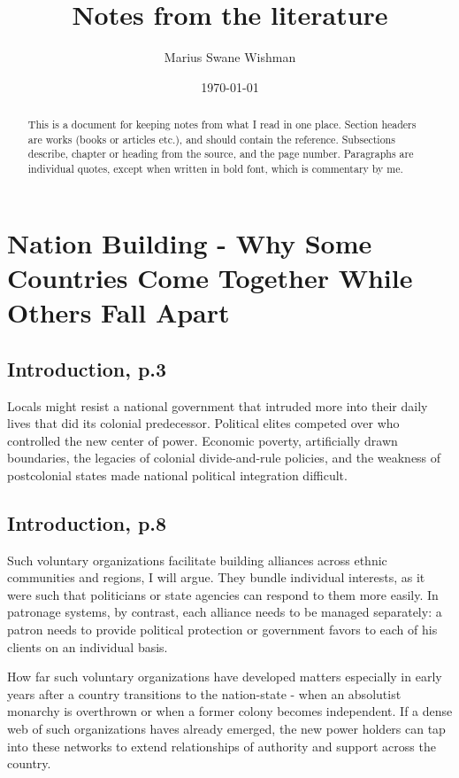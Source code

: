 \documentclass[12pt]{article}
\title{Notes from the literature}
\author[1]{Marius Swane Wishman}
\affil[1]{Department of Sociology and Political Science, NTNU}
\date{\today}
\begin{document}
\maketitle

\begin{abstract}

	This is a document for keeping notes from what I read in one place.
	Section headers are works (books or articles etc.), and should contain
	the reference. Subsections describe, chapter or heading from the source,
	and the page number. Paragraphs are individual quotes, except when
	written in bold font, which is commentary by me.

\end{abstract}

\pagebreak

\onehalfspacing
\section{Nation Building - Why Some Countries Come Together While Others Fall 
	Apart \citep{Wimmer_2018}}

\subsection{Introduction, p.3}

Locals might resist a national government that intruded more into their daily
lives that did its colonial predecessor.  Political elites competed over who
controlled the new center of power.  Economic poverty, artificially drawn
boundaries, the legacies of colonial divide-and-rule policies, and the weakness
of postcolonial states made national political integration difficult.

\subsection{Introduction, p.8}

Such voluntary organizations facilitate building alliances across ethnic
communities and regions, I will argue.  They bundle individual interests, as it
were such that politicians or state agencies can respond to them more easily.
In patronage systems, by contrast, each alliance needs to be managed separately:
a patron needs to provide political protection or government favors to each of
his clients on an individual basis.

\bigskip

How far such voluntary organizations have developed matters especially in early
years after a country transitions to the nation-state - when an absolutist
monarchy is overthrown or when a former colony becomes independent.  If a dense
web of such organizations haves already emerged, the new power holders can tap
into these networks to extend relationships of authority and support across the
country. 
\end{document}
